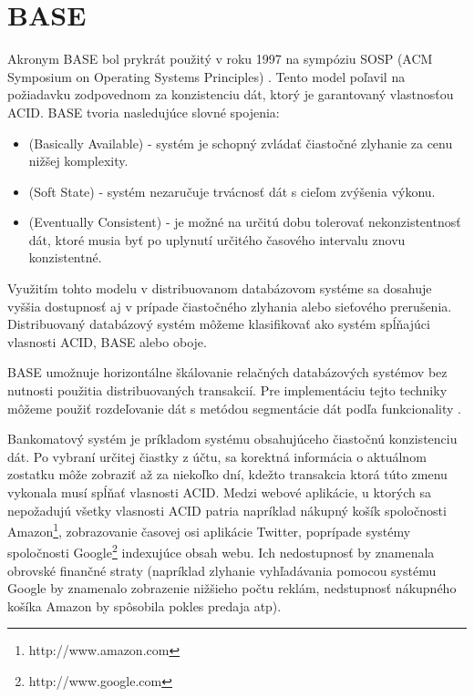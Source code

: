 \documentclass[11pt,twoside,a4paper]{book}
\begin{document}
\section{BASE} %
\label{section:base}
Akronym BASE bol prykrát použitý v roku 1997 na sympóziu SOSP (ACM Symposium on Operating Systems Principles) \cite{fox1997cluster}. Tento model poľavil na požiadavku zodpovednom za konzistenciu dát, ktorý je garantovaný vlastnosťou ACID. BASE tvoria nasledujúce slovné spojenia: 
\begin{itemize}
  \item \emph{} (Basically Available) - systém je schopný zvládať čiastočné zlyhanie za cenu nižšej komplexity.
  \item \emph{} (Soft State) - systém nezaručuje trvácnosť dát s cieľom zvýšenia výkonu. %
  \item \emph{} (Eventually Consistent) - je možné na určitú dobu tolerovať nekonzistentnosť dát, ktoré musia byť po uplynutí určitého časového intervalu znovu konzistentné.
\end{itemize}

Využitím tohto modelu v distribuovanom databázovom systéme sa dosahuje vyššia dostupnosť 
aj v prípade čiastočného zlyhania alebo sieťového prerušenia. Distribuovaný databázový systém môžeme klasifikovať ako systém spĺňajúci vlasnosti ACID, BASE alebo oboje.

BASE umožnuje horizontálne škálovanie relačných databázových systémov bez nutnosti použitia distribuovaných transakcií. Pre implementáciu tejto techniky môžeme použiť rozdeľovanie dát s metódou segmentácie dát podľa funkcionality \cite{Pritchett:2008:BAA:1394127.1394128}.


Bankomatový systém je príkladom systému obsahujúceho čiastočnú konzistenciu dát. Po vybraní určitej čiastky z účtu, sa korektná informácia o aktuálnom zostatku môže zobraziť až za niekoľko dní, kdežto transakcia ktorá túto zmenu vykonala musí spĺňať vlasnosti ACID. Medzi webové aplikácie, u ktorých sa nepožadujú všetky vlasnosti ACID patria napríklad nákupný košík spoločnosti Amazon\footnote{http://www.amazon.com}, zobrazovanie časovej osi aplikácie Twitter, poprípade systémy spoločnosti Google\footnote{http://www.google.com} indexujúce obsah webu. Ich nedostupnosť by znamenala obrovské finančné straty (napríklad zlyhanie vyhľadávania pomocou systému Google by znamenalo zobrazenie nižšieho počtu reklám, nedstupnosť nákupného košíka Amazon by spôsobila pokles predaja atp).
\end{document}

